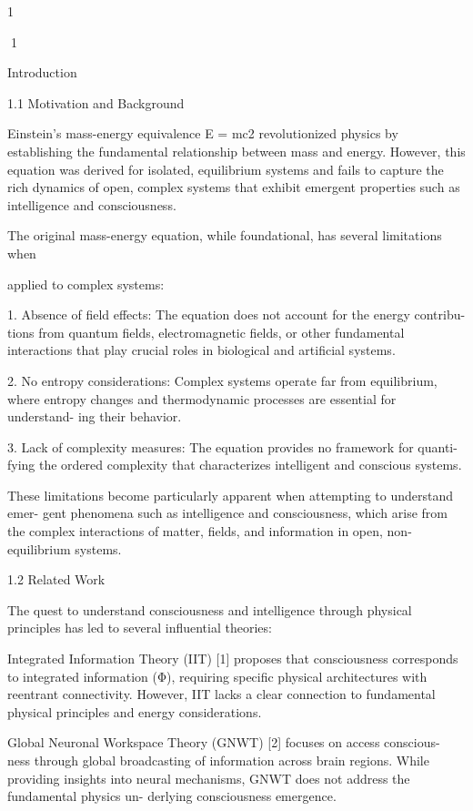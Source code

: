 1

1

Introduction

1.1 Motivation and Background

Einstein’s mass-energy equivalence E = mc2 revolutionized physics by establishing the
fundamental relationship between mass and energy. However, this equation was derived
for isolated, equilibrium systems and fails to capture the rich dynamics of open, complex
systems that exhibit emergent properties such as intelligence and consciousness.

The original mass-energy equation, while foundational, has several limitations when

applied to complex systems:

1. Absence of field effects: The equation does not account for the energy contribu-
tions from quantum fields, electromagnetic fields, or other fundamental interactions
that play crucial roles in biological and artificial systems.

2. No entropy considerations: Complex systems operate far from equilibrium,
where entropy changes and thermodynamic processes are essential for understand-
ing their behavior.

3. Lack of complexity measures: The equation provides no framework for quanti-
fying the ordered complexity that characterizes intelligent and conscious systems.

These limitations become particularly apparent when attempting to understand emer-
gent phenomena such as intelligence and consciousness, which arise from the complex
interactions of matter, fields, and information in open, non-equilibrium systems.

1.2 Related Work

The quest to understand consciousness and intelligence through physical principles has
led to several influential theories:

Integrated Information Theory (IIT) [1] proposes that consciousness corresponds
to integrated information (Φ), requiring specific physical architectures with reentrant
connectivity. However, IIT lacks a clear connection to fundamental physical principles
and energy considerations.

Global Neuronal Workspace Theory (GNWT) [2] focuses on access conscious-
ness through global broadcasting of information across brain regions. While providing
insights into neural mechanisms, GNWT does not address the fundamental physics un-
derlying consciousness emergence.

